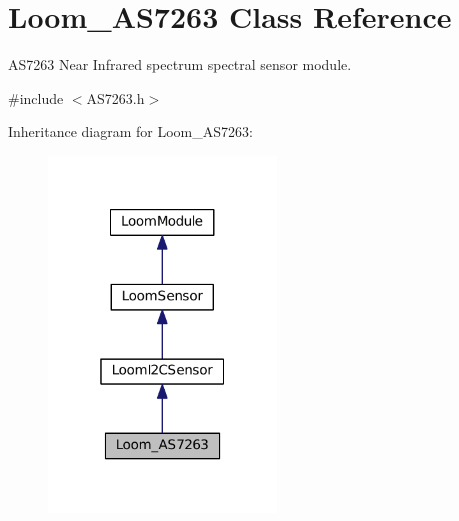 \hypertarget{class_loom___a_s7263}{}\section{Loom\+\_\+\+A\+S7263 Class Reference}
\label{class_loom___a_s7263}


A\+S7263 Near Infrared spectrum spectral sensor module.  




{\ttfamily \#include $<$A\+S7263.\+h$>$}



Inheritance diagram for Loom\+\_\+\+A\+S7263\+:\nopagebreak
\begin{figure}[H]
\begin{center}
\leavevmode
\includegraphics[width=172pt]{class_loom___a_s7263__inherit__graph}
\end{center}
\end{figure}
